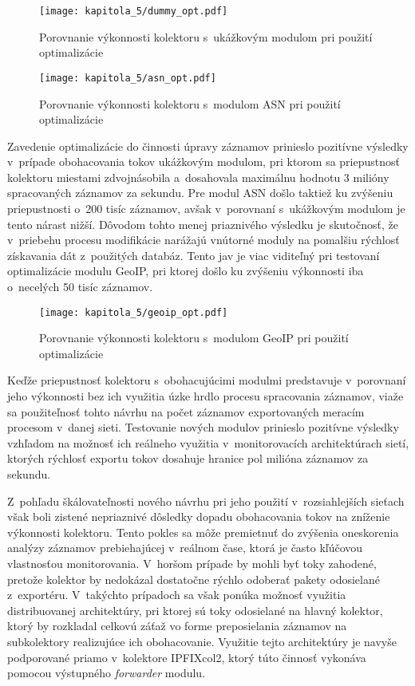 \begin{figure}[ht]
    \centering
    \texttt{[image: kapitola\_5/dummy\_opt.pdf]}
    \caption{Porovnanie výkonnosti kolektoru s~ukážkovým modulom pri použití optimalizácie}
    \label{fig:tests_dummy_opt}
\end{figure}

\begin{figure}[H]
    \centering
    \texttt{[image: kapitola\_5/asn\_opt.pdf]}
    \caption{Porovnanie výkonnosti kolektoru s~modulom ASN pri použití optimalizácie}
    \label{fig:tests_asn_opt}
\end{figure}

Zavedenie optimalizácie do činnosti úpravy záznamov prinieslo pozitívne výsledky v~prípade obohacovania tokov ukážkovým modulom, pri ktorom sa priepustnosť kolektoru miestami zdvojnásobila a~dosahovala maximálnu hodnotu 3 milióny spracovaných záznamov za sekundu.
Pre modul ASN došlo taktiež ku zvýšeniu priepustnosti o~200 tisíc záznamov, avšak v~porovnaní s~ukážkovým modulom je tento nárast nižší. Dôvodom tohto menej priaznivého výsledku je skutočnosť, že v~priebehu procesu modifikácie narážajú vnútorné moduly
na pomalšiu rýchlosť získavania dát z~použitých databáz. Tento jav je viac viditeľný pri testovaní optimalizácie modulu GeoIP, pri ktorej došlo ku zvýšeniu výkonnosti iba o~necelých 50 tisíc záznamov.

\begin{figure}[ht]
    \centering
    \texttt{[image: kapitola\_5/geoip\_opt.pdf]}
    \caption{Porovnanie výkonnosti kolektoru s~modulom GeoIP pri použití optimalizácie}
    \label{fig:tests_geoip_opt}
\end{figure}

Keďže priepustnosť kolektoru s~obohacujúcimi modulmi predstavuje v~porovnaní jeho výkonnosti bez ich využitia úzke hrdlo procesu spracovania záznamov, viaže sa použiteľnosť tohto návrhu na počet záznamov exportovaných meracím procesom v~danej
sieti. Testovanie nových modulov prinieslo pozitívne výsledky vzhľadom na možnosť ich reálneho využitia v~monitorovacích architektúrach sietí, ktorých rýchlosť exportu tokov dosahuje hranice pol milióna záznamov za sekundu.

Z~pohľadu škálovateľnosti nového návrhu pri jeho použití v~rozsiahlejších sieťach však boli zistené nepriaznivé dôsledky dopadu obohacovania tokov na zníženie výkonnosti kolektoru. Tento pokles sa môže premietnuť do zvýšenia oneskorenia analýzy
záznamov prebiehajúcej v~reálnom čase, ktorá je často kľúčovou vlastnosťou monitorovania. V~horšom prípade by mohli byť toky zahodené, pretože kolektor by nedokázal dostatočne rýchlo odoberať pakety odosielané z~exportéru. V~takýchto prípadoch sa však ponúka
možnosť využitia distribuovanej architektúry, pri ktorej sú toky odosielané na hlavný kolektor, ktorý by rozkladal celkovú záťaž vo forme preposielania záznamov na subkolektory realizujúce ich obohacovanie. Využitie tejto architektúry je navyše podporované priamo
v~kolektore IPFIXcol2, ktorý túto činnosť vykonáva pomocou výstupného \textit{forwarder} modulu.

